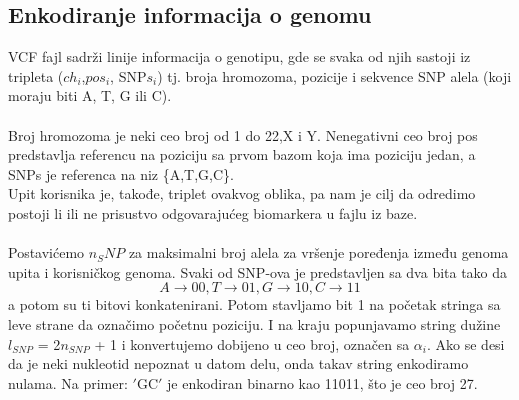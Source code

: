 \documentclass[a4paper]{article}
\begin{document}
\subsection{Enkodiranje informacija o genomu}
VCF fajl sadrži linije informacija o genotipu, gde se svaka od njih sastoji iz tripleta ($ch_i$,$pos_i$, SNP$s_i$) tj. broja hromozoma, pozicije i sekvence SNP alela  (koji moraju biti A, T, G ili C).\\\\
Broj hromozoma je neki ceo broj od 1 do 22,X i Y. Nenegativni ceo broj pos predstavlja referencu na poziciju sa prvom bazom koja ima poziciju jedan, a SNPs je referenca na niz \{A,T,G,C\}.\\
Upit korisnika je, takođe, triplet ovakvog oblika, pa nam je cilj da odredimo postoji li ili ne prisustvo odgovarajućeg biomarkera u fajlu iz baze. \\\\
Postavićemo $n_SNP$ za maksimalni broj alela za vršenje poređenja između genoma upita i korisničkog genoma. Svaki od SNP-ova je predstavljen sa dva bita tako da 
$$A \rightarrow 00, T \rightarrow 01, G \rightarrow 10, C \rightarrow 11$$
a potom su ti bitovi konkatenirani. Potom stavljamo bit 1 na početak stringa sa leve strane da označimo početnu poziciju. I na kraju popunjavamo string dužine $\textit{l}_{SNP}$ = 2$n_{SNP}$ + 1 i konvertujemo dobijeno u ceo broj, označen sa $\alpha_i$. Ako se desi da je neki nukleotid nepoznat u datom delu, onda takav string enkodiramo nulama. Na primer: $'$GC$'$ je enkodiran binarno kao 11011, što je ceo broj 27.
\end{document}
